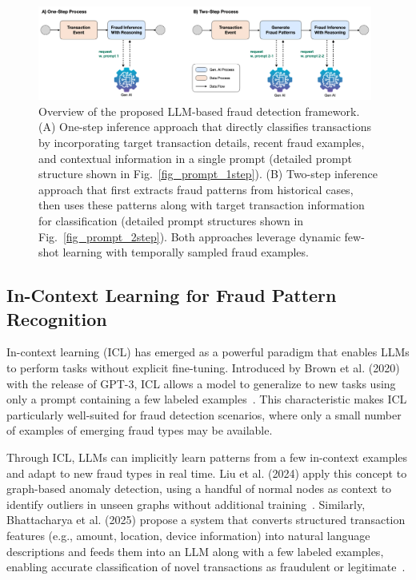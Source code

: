\documentclass[sigconf]{acmart}
\begin{document}
\begin{figure}[t!]
  \centering
  \includegraphics[width=0.98\textwidth]{./figures/fig_process.png}
  \caption{Overview of the proposed LLM-based fraud detection framework. (A) One-step inference approach that directly classifies transactions by incorporating target transaction details, recent fraud examples, and contextual information in a single prompt (detailed prompt structure shown in Fig.~\ref{fig_prompt_1step}). (B) Two-step inference approach that first extracts fraud patterns from historical cases, then uses these patterns along with target transaction information for classification (detailed prompt structures shown in Fig.~\ref{fig_prompt_2step}). Both approaches leverage dynamic few-shot learning with temporally sampled fraud examples.}
  \label{fig_process}
\end{figure}


\subsection{In-Context Learning for Fraud Pattern Recognition}
In-context learning (ICL) has emerged as a powerful paradigm that enables LLMs to perform tasks without explicit fine-tuning. Introduced by Brown et al. (2020) with the release of GPT-3, ICL allows a model to generalize to new tasks using only a prompt containing a few labeled examples~\cite{brown2020llm_fewshot}. This characteristic makes ICL particularly well-suited for fraud detection scenarios, where only a small number of examples of emerging fraud types may be available.

Through ICL, LLMs can implicitly learn patterns from a few in-context examples and adapt to new fraud types in real time. Liu et al. (2024) apply this concept to graph-based anomaly detection, using a handful of normal nodes as context to identify outliers in unseen graphs without additional training~\cite{liu2024anomaly}. Similarly, Bhattacharya et al. (2025) propose a system that converts structured transaction features (e.g., amount, location, device information) into natural language descriptions and feeds them into an LLM along with a few labeled examples, enabling accurate classification of novel transactions as fraudulent or legitimate~\cite{bhattacharya2024fraud}.
\end{document}
